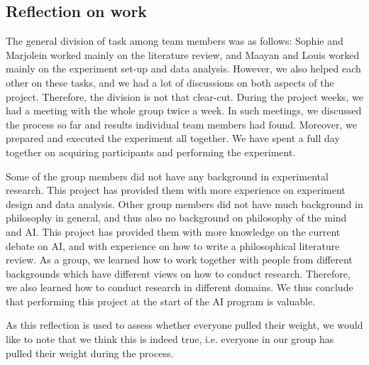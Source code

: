\subsection{Reflection on work}
The general division of task among team members was as follows: Sophie and Marjolein worked mainly on the literature review, and Maayan and Louis worked mainly on the experiment set-up and data analysis. However, we also helped each other on these tasks, and we had a lot of discussions on both aspects of the project. Therefore, the division is not that clear-cut. During the project weeks, we had a meeting with the whole group twice a week. In such meetings, we discussed the process so far and results individual team members had found. Moreover, we prepared and executed the experiment all together. We have spent a full day together on acquiring participants and performing the experiment.

Some of the group members did not have any background in experimental research. This project has provided them with more experience on experiment design and data analysis. Other group members did not have much background in philosophy in general, and thus also no background on philosophy of the mind and AI. This project has provided them with more knowledge on the current debate on AI, and with experience on how to write a philosophical literature review. As a group, we learned how to work together with people from different backgrounds which have different views on how to conduct research. Therefore, we also learned how to conduct research in different domains. We thus conclude that performing this project at the start of the AI program is valuable.

As this reflection is used to assess whether everyone pulled their weight, we would like to note that we think this is indeed true, i.e. everyone in our group has pulled their weight during the process.
